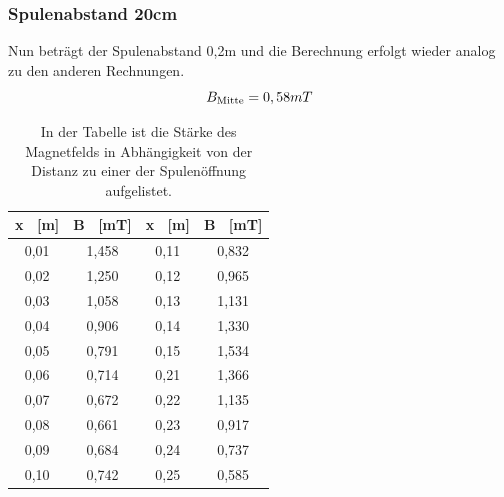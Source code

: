 \documentclass[titlepage = firstcover]{scrartcl}
\begin{document}
            \subsubsection{Spulenabstand 20cm}
            Nun beträgt der Spulenabstand 0,2m und die Berechnung erfolgt wieder analog zu den anderen Rechnungen.
            \begin{equation}
                B_{\text{Mitte}} = 0,58 mT \\
                \label{eqn:HelmC}
            \end{equation} 
            \begin{table}[h]
                \centering 
                \caption{In der Tabelle ist die Stärke des Magnetfelds in Abhängigkeit von der Distanz zu einer der Spulenöffnung aufgelistet.}
                \label{tab:HelmholtzC}

                \begin{tabular}{c c c c}
                    \toprule
                    {x \ [m]} & {B \ [mT]} & {x \ [m]} & {B \ [mT]} \\
                    \midrule
                    0,01 & 1,458 & 0,11 & 0,832 \\
                    0,02 & 1,250 & 0,12 & 0,965 \\
                    0,03 & 1,058 & 0,13 & 1,131 \\
                    0,04 & 0,906 & 0,14 & 1,330 \\
                    0,05 & 0,791 & 0,15 & 1,534 \\
                    0,06 & 0,714 & 0,21 & 1,366 \\
                    0,07 & 0,672 & 0,22 & 1,135 \\
                    0,08 & 0,661 & 0,23 & 0,917 \\
                    0,09 & 0,684 & 0,24 & 0,737 \\
                    0,10 & 0,742 & 0,25 & 0,585 \\
                    \bottomrule
                \end{tabular}                
            \end{table}
\end{document}

